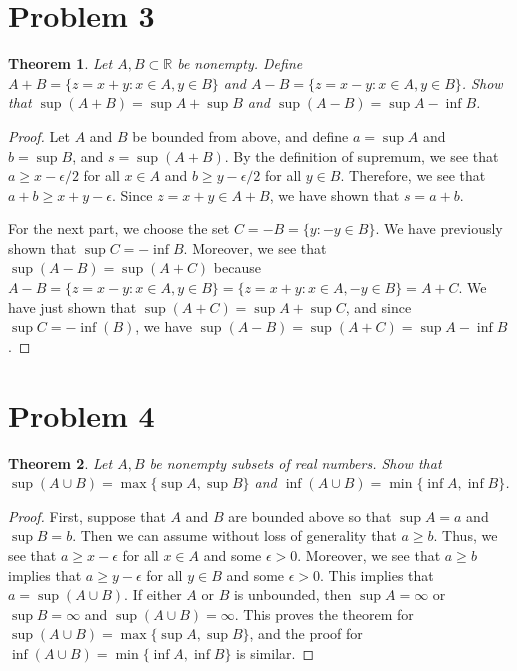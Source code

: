 \documentclass[psamsfonts]{amsart}
\newtheorem{thm}{Theorem}[section]
\theoremstyle{definition}
\theoremstyle{remark}
\numberwithin{equation}{section}
\begin{document}
\section{Problem 3}

\begin{thm}
Let $A, B \subset \mathbb{R}$ be nonempty. Define $A + B = \{ z = x+y: x \in A, y \in B \}$ and $A - B = \{ z = x-y: x \in A, y \in B \}$. Show that $\sup(A+B) = \sup A + \sup B$ and $\sup (A-B) = \sup A - \inf B$. 
\end{thm}

\begin{proof}
Let $A$ and $B$ be bounded from above, and define $a = \sup A$ and $b = \sup B$, and $s = \sup(A+B)$. By the definition of supremum, we see that $a \geq x - \epsilon / 2$ for all $x \in A$ and $b \geq y - \epsilon/2 $ for all $y \in B$. Therefore, we see that $a+b \geq x + y - \epsilon$. Since $z = x + y \in A + B$, we have shown that $s = a + b$. 

For the next part, we choose the set $C = - B = \{ y: -y \in B \}$. We have previously shown that $ \sup C = - \inf B$. Moreover, we see that $\sup(A-B) = \sup(A + C)$ because $A - B = \{ z = x-y : x \in A, y \in B \} = \{ z = x + y: x \in A, -y \in B \} = A + C$. We have just shown that $\sup(A + C) = \sup A + \sup C$, and since $\sup C = - \inf(B)$, we have $\sup(A-B) = \sup(A+C) = \sup A - \inf B$.  
\end{proof}

\section{Problem 4}

\begin{thm}
Let $A,B$ be nonempty subsets of real numbers. Show that $\sup(A \cup B) = \max \{ \sup A, \sup B \}$ and $\inf(A \cup B) = \min \{ \inf A , \inf B \}$. 
\end{thm}

\begin{proof}
First, suppose that $A$ and $B$ are bounded above so that $\sup A = a$ and $\sup B = b$. Then we can assume without loss of generality that $ a \geq b$. Thus, we see that $a \geq x - \epsilon$ for all $x \in A$ and some $\epsilon > 0$. Moreover, we see that $a \geq b$ implies that $a \geq y - \epsilon$ for all $y \in B$ and some $\epsilon > 0$. This implies that $a = \sup (A \cup B)$. If either $A$ or $B$ is unbounded, then $\sup A = \infty$ or $\sup B = \infty$ and $\sup(A\cup B) = \infty$. This proves the theorem for $\sup(A \cup B) = \max \{ \sup A, \sup B \}$, and the proof for $\inf(A \cup B) = \min \{ \inf A , \inf B \}$ is similar. 
\end{proof}
\end{document}
